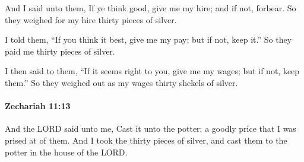 			\begin{versebox}
					\item[BHS] 
					\item[LXX] 
					\item[ASV] And I said unto them, If ye think good, give me my hire; and if not, forbear. So they weighed for my hire thirty pieces of silver.
					\item[NIV] I told them, “If you think it best, give me my pay; but if not, keep it.” So they paid me thirty pieces of silver.
					\item[NRSV] I then said to them, “If it seems right to you, give me my wages; but if not, keep them.” So they weighed out as my wages thirty shekels of silver.
			\end{versebox}

		\paragraph{Zechariah 11:13} %
			\label{ZECHARIAH-11-13}

			And the LORD said unto me, Cast it unto the potter: a goodly price that I was prised at of them. And I took the thirty pieces of silver, and cast them to the potter in the house of the LORD.

